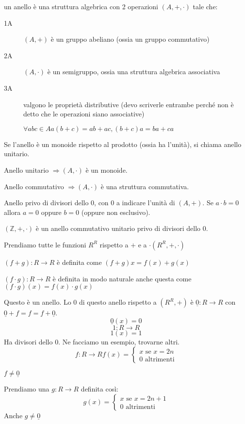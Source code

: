 un anello \`e una struttura algebrica con 2 operazioni $(A, +, \cdot)$ tale che:

\begin{description}
    \item[1A] $(A, +)$ \`e un gruppo abeliano (ossia un gruppo commutativo)
    \item[2A] $(A, \cdot)$ \`e un semigruppo, ossia una struttura algebrica associativa
    \item[3A] valgono le propriet\`a distributive (devo scriverle entrambe perch\'e non \`e detto che le operazioni siano associative) %

    $\forall a b c \in A a (b + c) = ab + ac, (b + c) a = b a + c a$
\end{description}

Se l'anello \`e un monoide rispetto al prodotto (ossia ha l'unit\`a), si chiama anello unitario.

Anello unitario $\Rightarrow (A, \cdot)$ \`e un monoide.

Anello commutativo $\Rightarrow (A, \cdot)$ \`e una struttura commutativa.

Anello privo di divisori dello 0, con 0 a indicare l'unit\`a di $(A, +)$. Se $a \cdot b = 0$ allora $a = 0$ oppure $b = 0$ (oppure non esclusivo).

$(\mathbb{Z}, +, \cdot)$ \`e un anello commutativo unitario privo di divisori dello 0.

Prendiamo tutte le funzioni $R^R$ rispetto a $+$ e a $\cdot (R^R, +, \cdot)$

$(f + g) : R \to R$ \`e definita come $(f + g) x = f(x) + g(x) $

$(f \cdot g) : R \to R$ \`e definita in modo naturale anche questa come $(f \cdot g) (x) = f(x) \cdot g(x)$

Questo \`e un anello. Lo 0 di questo anello rispetto a $(R^R, +)$ \`e $\underline{0} : R \to R$ con $\underline{0} + f = f = f + \underline{0}$.
\[
\underline{0} (x) = 0
\]
\[
1 : R \to R
\]
\[
1(x) = 1
\]
Ha divisori dello 0. Ne facciamo un esempio, trovarne altri.
\[
f : R \to R
f(x) =
\begin{cases}
x \text{ se } x = 2n \\
0 \text{ altrimenti}
\end{cases}
\]

$f \neq \underline{0}$

Prendiamo una $g : R \to R$ definita cos\`i:
\[
g(x) =
\begin{cases}
x \text{ se } x = 2n + 1 \\
0 \text{ altrimenti}
\end{cases}
\]
Anche $g \neq \underline{0}$

